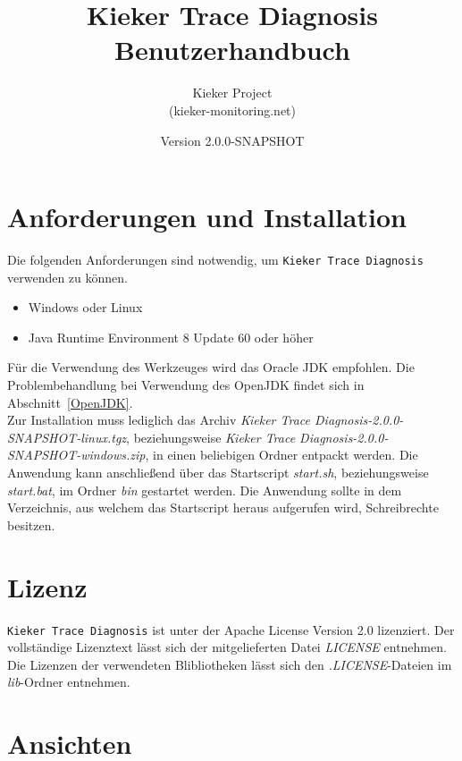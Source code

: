 \documentclass{article}
\begin{document}
  \newcommand{\version}[0]{2.0.0-SNAPSHOT}
  \newcommand{\KiekerTraceDiagnosis}[0]{\texttt{Kieker Trace Diagnosis}}
  \newcommand{\file}[1]{\textit{#1}}

  \title{Kieker Trace Diagnosis\\Benutzerhandbuch}
  \date{Version \version{}}
  \author{Kieker Project\\(kieker-monitoring.net)}

  \maketitle

  \section{Anforderungen und Installation}
  Die folgenden Anforderungen sind notwendig, um \KiekerTraceDiagnosis{} verwenden zu können.
  \begin{itemize}
    \item Windows oder Linux
    \item Java Runtime Environment 8 Update 60 oder höher
  \end{itemize}
  Für die Verwendung des Werkzeuges wird das Oracle JDK empfohlen. Die Problembehandlung bei Verwendung des OpenJDK findet sich in Abschnitt~\ref{OpenJDK}.\\

  Zur Installation muss lediglich das Archiv \file{Kieker Trace Diagnosis-\version{}-linux.tgz}, beziehungsweise \file{Kieker Trace Diagnosis-\version{}-windows.zip}, in einen beliebigen Ordner entpackt werden.
  Die Anwendung kann anschließend über das Startscript \file{start.sh}, beziehungsweise \file{start.bat}, im Ordner \file{bin} gestartet werden.
  Die Anwendung sollte in dem Verzeichnis, aus welchem das Startscript heraus aufgerufen wird, Schreibrechte besitzen.

  \section{Lizenz}

  \KiekerTraceDiagnosis{} ist unter der Apache License Version 2.0 lizenziert.
  Der vollständige Lizenztext lässt sich der mitgelieferten Datei \file{LICENSE} entnehmen.
  Die Lizenzen der verwendeten Blibliotheken lässt sich den \file{.LICENSE}-Dateien im \file{lib}-Ordner entnehmen.

  \section{Ansichten}
\end{document}
